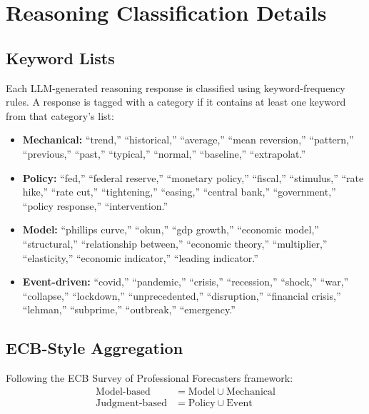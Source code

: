 \documentclass[11pt,letterpaper]{scrartcl}
\begin{document}
\section{Reasoning Classification Details}\label{app:reasoning}

\subsection{Keyword Lists}

Each LLM-generated reasoning response is classified using keyword-frequency rules. A response is tagged with a category if it contains at least one keyword from that category's list:

\begin{itemize}
    \item \textbf{Mechanical:} ``trend,'' ``historical,'' ``average,'' ``mean reversion,'' ``pattern,'' ``previous,'' ``past,'' ``typical,'' ``normal,'' ``baseline,'' ``extrapolat.''
    
    \item \textbf{Policy:} ``fed,'' ``federal reserve,'' ``monetary policy,'' ``fiscal,'' ``stimulus,'' ``rate hike,'' ``rate cut,'' ``tightening,'' ``easing,'' ``central bank,'' ``government,'' ``policy response,'' ``intervention.''
    
    \item \textbf{Model:} ``phillips curve,'' ``okun,'' ``gdp growth,'' ``economic model,'' ``structural,'' ``relationship between,'' ``economic theory,'' ``multiplier,'' ``elasticity,'' ``economic indicator,'' ``leading indicator.''
    
    \item \textbf{Event-driven:} ``covid,'' ``pandemic,'' ``crisis,'' ``recession,'' ``shock,'' ``war,'' ``collapse,'' ``lockdown,'' ``unprecedented,'' ``disruption,'' ``financial crisis,'' ``lehman,'' ``subprime,'' ``outbreak,'' ``emergency.''
\end{itemize}

\subsection{ECB-Style Aggregation}

Following the ECB Survey of Professional Forecasters framework:
\begin{align*}
\text{Model-based} &= \text{Model} \cup \text{Mechanical} \\
\text{Judgment-based} &= \text{Policy} \cup \text{Event}
\end{align*}
\end{document}
